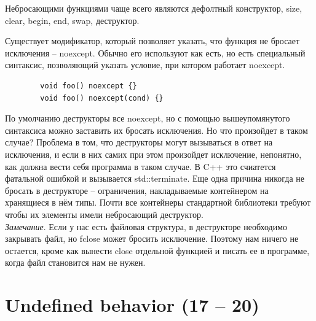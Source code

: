 \documentclass[12pt, a4paper]{article}
\begin{document}
	\par Небросающими функциями чаще всего являются дефолтный конструктор, size, clear, begin, end, swap, деструктор.
	\\\par
	Существует модификатор, который позволяет указать, что функция не бросает исключения -- noexcept. Обычно его используют как есть, но есть специальный синтаксис, позволяющий указать условие, при котором работает noexcept.
	\begin{verbatim}
		void foo() noexcept {}
		void foo() noexcept(cond) {}
	\end{verbatim}
	\par По умолчанию деструкторы все noexcept, но с помощью вышеупомянутого синтаксиса можно заставить их бросать исключения. Но что произойдет в таком случае? Проблема в том, что деструкторы могут вызываться в ответ на исключения, и если в них самих при этом произойдет исключение, непонятно, как должна вести себя программа в таком случае. В C++ это счиатется фатальной ошибкой и вызывается std::terminate. Еще одна причина никогда не бросать в деструкторе -- ограничения, накладываемые контейнером на хранящиеся в нём типы. Почти все контейнеры стандартной библиотеки требуют чтобы их элементы имели небросающий деструктор.\\
	\textit{Замечание}. Если у нас есть файловая структура, в деструкторе необходимо закрывать файл, но fclose может бросить исключение. Поэтому нам ничего не остается, кроме как вынести close отдельной функцией и писать ее в программе, когда файл становится нам не нужен.
	\section{Undefined behavior (17 -- 20)}
\end{document}
